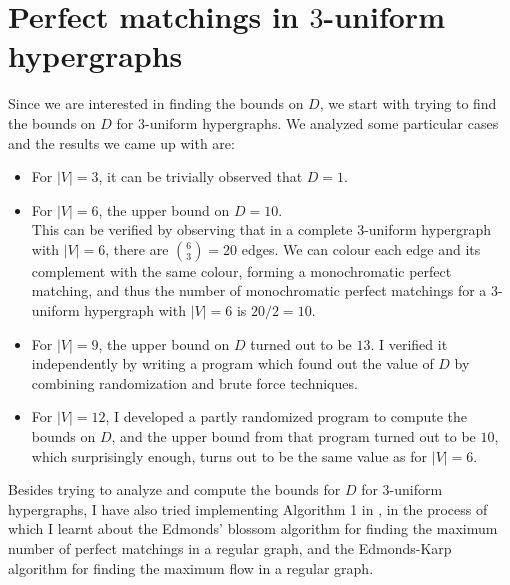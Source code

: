 \documentclass[11pt]{article}
\begin{document}
\section*{Perfect matchings in $3$-uniform hypergraphs}
Since we are interested in finding the bounds on $D$, we start with trying to find the bounds on $D$ for $3$-uniform hypergraphs. We analyzed some particular cases and the results we came up with are:
\begin{itemize}
    \item For $|V|=3$, it can be trivially observed that $D=1$.
    \item For $|V|=6$, the upper bound on $D=10$. \\
    This can be verified by observing that in a complete $3$-uniform hypergraph with $|V|=6$, there are $\displaystyle\binom{6}{3}=20$ edges. We can colour each edge and its complement with the same colour, forming a monochromatic perfect matching, and thus the number of monochromatic perfect matchings for a $3$-uniform hypergraph with $|V|=6$ is $20/2=10$.
    \item For $|V|=9$, the upper bound on $D$ turned out to be $13$. I verified it independently by writing a program which found out the value of $D$ by combining randomization and brute force techniques. 
    \item For $|V|=12$, I developed a partly randomized program to compute the bounds on $D$, and the upper bound from that program turned out to be $10$, which surprisingly enough, turns out to be the same value as for $|V|=6$.
\end{itemize}

\vspace{1cm}
Besides trying to analyze and compute the bounds for $D$ for $3$-uniform hypergraphs, I have also tried implementing Algorithm 1 in \cite{chandran2022perfect}, in the process of which I learnt about the Edmonds' blossom algorithm for finding the maximum number of perfect matchings in a regular graph, and the Edmonds-Karp algorithm for finding the maximum flow in a regular graph.




\end{document}
